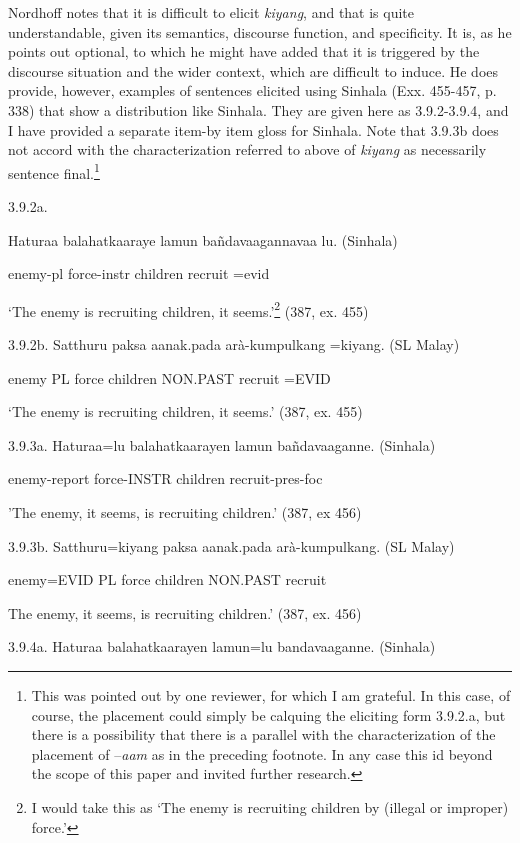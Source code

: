 \documentclass[letterpaper]{article}
\begin{document}
 Nordhoff notes that it is difficult to elicit \textit{kiyang}, and that is quite understandable, given its semantics, discourse function, and specificity. It is, as he points out optional, to which he might have added that it is triggered by the discourse situation and the wider context, which are difficult to induce. He does provide, however, examples of sentences elicited using Sinhala (Exx. 455-457, p. 338) that show a distribution like Sinhala. They are given here as 3.9.2-3.9.4, and I have provided a separate item-by item gloss for Sinhala. Note that 3.9.3b does not accord with the characterization referred to above of \textit{kiyang} as necessarily sentence final.\footnote{This
  was pointed out by one reviewer, for which I am grateful. In this case, of course, the placement could simply be calquing the eliciting form 3.9.2.a, but there is a possibility that there is a parallel with the characterization of the placement of --\textit{aam} as in the preceding footnote. In any case this id beyond the scope of this paper and invited further research.}

 3.9.2a. 

\ea
\gll Haturaa balahatkaaraye{\textcopyright} lamun ba\~ndavaagannavaa lu.  (Sinhala)

  enemy-pl force-instr children recruit =evid

  `The enemy is recruiting children, it seems.'\footnote{I
  would take this as `The enemy is recruiting children by (illegal or improper) force.'} (387, ex. 455)

 3.9.2b. 
\ea
\gll Satthuru paksa aanak.pada arà-kumpulkang =kiyang.  (SL Malay)

  enemy  PL force children NON.PAST recruit  =EVID

  `The enemy is recruiting children, it seems.' (387, ex. 455)

 3.9.3a. 
\ea
\gll Haturaa=lu balahatkaarayen lamun ba\~ndavaaganne. (Sinhala)

  enemy-report force-INSTR children recruit-pres-foc 

'The enemy, it seems, is recruiting children.' (387, ex 456)

 3.9.3b. 
\ea
\gll Satthuru=kiyang paksa aanak.pada arà-kumpulkang. (SL Malay)

  enemy=EVID  PL force children NON.PAST recruit  

   The enemy, it seems, is recruiting children.' (387, ex. 456)

 3.9.4a. 
\ea
\gll Haturaa balahatkaarayen lamun=lu bandavaaganne. (Sinhala)
\end{document}
